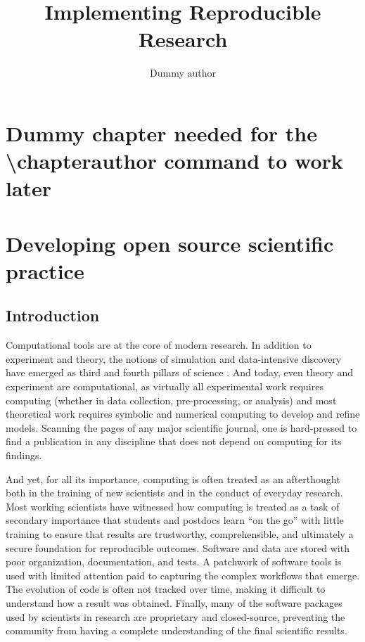 \documentclass[ChapterTOCs,krantz2]{krantz} %
\theoremstyle{definition}
\begin{document}
\title{Implementing Reproducible Research}
\author{Dummy author}
\chapter*{Dummy chapter needed for the \textbackslash chapterauthor command to work later}

\mainmatter


\chapter{Developing open source scientific practice}

\section{Introduction}\label{intro}

Computational tools are at the core of modern research. In addition
to experiment and theory, the notions of simulation and data-intensive
discovery have emerged as third and fourth pillars of science \cite{4th-paradigm}.
And today, even theory and experiment are computational, as virtually
all experimental work requires computing (whether in data collection,
pre-processing, or analysis) and most theoretical work requires symbolic
and numerical computing to develop and refine models. Scanning the pages
of any major scientific journal, one is hard-pressed to find a publication
in any discipline that does not depend on computing for its findings.

And yet, for all its importance, computing is often treated as an
afterthought both in the training of new scientists and in the conduct of
everyday research. Most working scientists have witnessed how computing is
treated as a task of secondary importance that students and postdocs learn
``on the go'' with little training to ensure that results are trustworthy,
comprehensible, and ultimately a secure foundation for reproducible outcomes.
Software and data are stored with poor organization, documentation, and tests.
A patchwork of software tools is used with limited attention paid to
capturing the complex workflows that emerge.  The evolution of code is
often not tracked over time, making it difficult to understand how a result
was obtained. Finally, many of the software packages used by scientists in
research are proprietary and closed-source, preventing the community from
having a complete understanding of the final scientific results.
\end{document}
